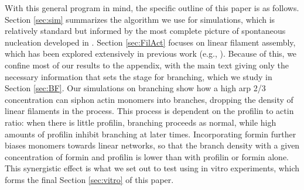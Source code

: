 \documentclass[11pt]{article}
\begin{document}

With this general program in mind, the specific outline of this paper is as follows. Section \ref{sec:sim} summarizes the algorithm we use for simulations, which is relatively standard but informed by the most complete picture of spontaneous nucleation developed in \cite{rosenbloom2021mechanism}. Section \ref{sec:FilAct} focuses on linear filament assembly, which has been explored extensively in previous work (e.g., \cite{fass2008stochastic, banerjee2022size}). Because of this, we confine most of our results to the appendix, with the main text giving only the necessary information that sets the stage for branching, which we study in Section \ref{sec:BF}. Our simulations on branching show how a high arp 2/3 concentration can siphon actin monomers into branches, dropping the density of linear filaments in the process. This process is dependent on the profilin to actin ratio: when there is little profilin, branching proceeds as normal, while high amounts of profilin inhibit branching at later times. Incorporating formin further biases monomers towards linear networks, so that the branch density with a given concentration of formin and profilin is lower than with profilin or formin alone. This synergistic effect is what we set out to test using in vitro experiments, which forms the final Section \ref{sec:vitro} of this paper.
\end{document}
